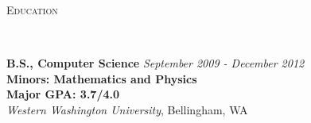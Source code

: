 \documentclass[9pt]{article}
\newenvironment{changemargin}[2]{%
  \begin{list}{}{%
    \setlength{\topsep}{0pt}%
    \setlength{\leftmargin}{#1}%
    \setlength{\rightmargin}{#2}%
    \setlength{\listparindent}{\parindent}%
    \setlength{\itemindent}{\parindent}%
    \setlength{\parsep}{\parskip}%
  }%
  \item[]}{\end{list}
}
\newcommand{\lineover}{
    \begin{changemargin}{-0.05in}{-0.05in}
        \vspace*{-8pt}
        \hrulefill \\
        \vspace*{-2pt}
    \end{changemargin}
}
\newcommand{\header}[1]{
    \begin{changemargin}{-0.5in}{-0.5in}
        \scshape{#1}\\
        \lineover
    \end{changemargin}
}
\newenvironment{body} {
    \vspace*{-16pt}
    \begin{changemargin}{-0.20in}{-0.5in}
  }
    {\end{changemargin}
}
\begin{document}
\smallskip


\header{Education}

\begin{body}
    \vspace{14pt}

    \textbf{B.S., Computer Science}{} \hfill \emph{September 2009 - December 2012}{} \\
    \textbf{Minors: Mathematics and Physics}\\
    \textbf{Major GPA: 3.7/4.0}\\
    \emph{Western Washington University}, Bellingham, WA{} \\


\end{body}

\smallskip

\end{document}

